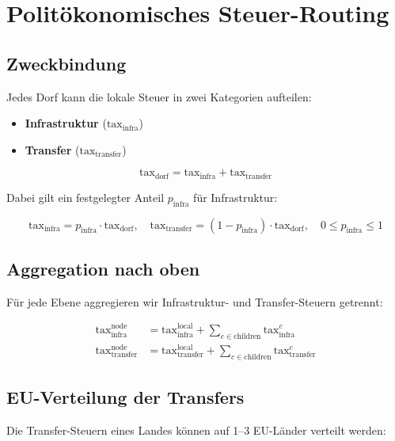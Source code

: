 \section{Politökonomisches Steuer-Routing}

\subsection{Zweckbindung}
Jedes Dorf kann die lokale Steuer in zwei Kategorien aufteilen:
\begin{itemize}
    \item \textbf{Infrastruktur} ($\text{tax}_\text{infra}$)
    \item \textbf{Transfer} ($\text{tax}_\text{transfer}$)
\end{itemize}

\begin{equation}
\text{tax}_\text{dorf} = \text{tax}_\text{infra} + \text{tax}_\text{transfer}
\end{equation}

Dabei gilt ein festgelegter Anteil $p_\text{infra}$ für Infrastruktur:

\begin{equation}
\text{tax}_\text{infra} = p_\text{infra} \cdot \text{tax}_\text{dorf}, \quad
\text{tax}_\text{transfer} = (1 - p_\text{infra}) \cdot \text{tax}_\text{dorf}, \quad 0 \le p_\text{infra} \le 1
\end{equation}

\subsection{Aggregation nach oben}
Für jede Ebene aggregieren wir Infrastruktur- und Transfer-Steuern getrennt:

\begin{align}
\text{tax}_\text{infra}^{\text{node}} &= \text{tax}_\text{infra}^{\text{local}} + \sum_{c \in \text{children}} \text{tax}_\text{infra}^c \\
\text{tax}_\text{transfer}^{\text{node}} &= \text{tax}_\text{transfer}^{\text{local}} + \sum_{c \in \text{children}} \text{tax}_\text{transfer}^c
\end{align}

\subsection{EU-Verteilung der Transfers}
Die Transfer-Steuern eines Landes können auf 1--3 EU-Länder verteilt werden:

